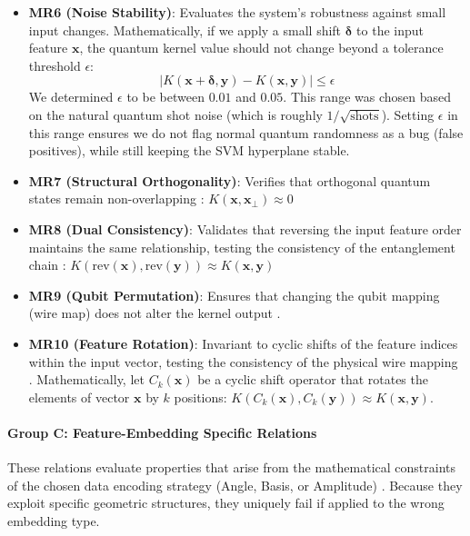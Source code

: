 \documentclass[12pt,a4paper]{article}
\begin{document}
	\begin{itemize}
		\item \textbf{MR6 (Noise Stability)}: Evaluates the system's robustness against small input changes. Mathematically, if we apply a small shift $\boldsymbol{\delta}$ to the input feature $\mathbf{x}$, the quantum kernel value should not change beyond a tolerance threshold $\epsilon$:
		$$ |K(\mathbf{x} + \boldsymbol{\delta}, \mathbf{y}) - K(\mathbf{x}, \mathbf{y})| \le \epsilon $$
		We determined $\epsilon$ to be between $0.01$ and $0.05$. This range was chosen based on the natural quantum shot noise (which is roughly $1/\sqrt{\text{shots}}$). Setting $\epsilon$ in this range ensures we do not flag normal quantum randomness as a bug (false positives), while still keeping the SVM hyperplane stable.
		\item \textbf{MR7 (Structural Orthogonality)}: Verifies that orthogonal quantum states remain non-overlapping \cite{schuld2019}: $K(\mathbf{x}, \mathbf{x}_{\perp}) \approx 0$
		\item \textbf{MR8 (Dual Consistency)}: Validates that reversing the input feature order maintains the same relationship, testing the consistency of the entanglement chain \cite{Paltenghi2023}: $K(\text{rev}(\mathbf{x}), \text{rev}(\mathbf{y})) \approx K(\mathbf{x}, \mathbf{y})$
		\item \textbf{MR9 (Qubit Permutation)}: Ensures that changing the qubit mapping (wire map) does not alter the kernel output \cite{Paltenghi2023}.
		\item \textbf{MR10 (Feature Rotation)}: Invariant to cyclic shifts of the feature indices within the input vector, testing the consistency of the physical wire mapping \cite{LaRose2020}. Mathematically, let $C_k(\mathbf{x})$ be a cyclic shift operator that rotates the elements of vector $\mathbf{x}$ by $k$ positions: $K(C_k(\mathbf{x}), C_k(\mathbf{y})) \approx K(\mathbf{x}, \mathbf{y})$.
	\end{itemize}
	
	\paragraph{Group C: Feature-Embedding Specific Relations}
	These relations evaluate properties that arise from the mathematical constraints of the chosen data encoding strategy (Angle, Basis, or Amplitude) \cite{zaman2025surveyquantummachinelearning, schuld2018}. Because they exploit specific geometric structures, they uniquely fail if applied to the wrong embedding type.
	
\end{document}
